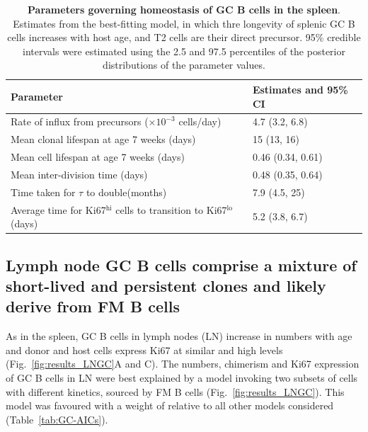 \documentclass[11pt]{article}
\newcommand{\red}[1]{{\color{red}{#1}}}
\newcommand{\khi}{Ki67$^\text{hi}$}
\newcommand{\klo}{Ki67$^\text{lo}$}
\begin{document}
\begin{table}[htbp]
\begin{center}
		\renewcommand{\arraystretch}{1.25}
		\begin{tabular}{l l }
			\toprule
			\textbf{Parameter}                                & \textbf{Estimates and 95\% CI} \\
			\toprule
			Rate of influx from precursors ($\times 10^{-3}$ cells/day)      & 4.7 (3.2, 6.8)       \\
			Mean clonal lifespan  at age 7 weeks (days)   & 15 (13, 16)           \\
			Mean cell lifespan at age 7 weeks (days)             & 0.46 (0.34, 0.61)     \\			
			Mean inter-division time (days)                          & 0.48 (0.35, 0.64)     \\
			Time taken for $\tau$ to double(months)                  & 7.9 (4.5, 25)        \\
			Average time for {\khi} cells to transition to {\klo} (days)            & 5.2 (3.8, 6.7)  \\					
			\hline
			\toprule 
		\end{tabular}
	\end{center}
	\caption{ \textbf{Parameters governing homeostasis of GC B cells in the spleen}. Estimates from the best-fitting  model, in which thre longevity of splenic GC B cells increases with host age, and T2 cells are their direct precursor.  95\% credible intervals were estimated using the 2.5 and 97.5 percentiles of the posterior distributions of the parameter values.}
	\label{tab:SPGC-parestm}
\end{table} 
	
\subsection*{Lymph node GC B cells comprise a mixture of short-lived and persistent clones and likely derive from FM B cells}
As in the spleen, GC B cells in lymph nodes (LN) increase in numbers with age and donor and host cells express Ki67 at similar and high levels (Fig.~\ref{fig:results_LNGC}A and C). The numbers, chimerism and Ki67 expression of GC B cells in LN were best explained by a model invoking two subsets of cells with different kinetics, sourced by FM B cells (Fig.~\ref{fig:results_LNGC}).  This model was favoured with a weight of \red{XYZ\%} relative to all other models considered (Table~\ref{tab:GC-AICs}).
\end{document}
